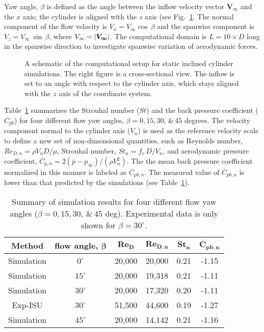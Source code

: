 Yaw angle, $\beta$ is defined as the angle between the inflow velocity vector
$\boldsymbol{V_\infty}$ and the $x$ axis; the cylinder is aligned with the $z$
axis (see Fig.~\ref{fig:yawedModel}. The normal component of the flow velocity
is $V_n=V_\infty \cos\,\beta$ and the spanwise component is $V_z = V_\infty
\,\sin\,\beta$, where $V_\infty=\left| \boldsymbol{V_\infty} \right|$. The computational
domain is $L=10\times D$ long in the spanwise direction to investigate spanwise
variation of aerodynamic forces.
%
\begin{figure}[htb!]
  \caption{A schematic of the computational setup for static inclined cylinder
    simulations. The right figure is a cross-sectional view.  The inflow is set
    to an angle with respect to the cylinder axis, which stays aligned with the $z$
    axis of the coordinate system.}
  \label{fig:yawedModel}
\end{figure}

Table~\ref{tab:comparisonYawedRe20k} summarizes the Strouhal number ($St$) and
the back pressure coefficient ($C_{pb}$) for four different flow yaw angles,
$\beta=0,15,30,\,\&\,45$ degrees. The velocity component normal to the cylinder
axis ($V_n$) is used as the reference velocity scale to define a new set of
non-dimensional quantities, such as Reynolds number, $Re_{D,n} = \rho V_n D /
\mu$, Strouhal number, $St_{n}=f_v\,D /V_n$, and aerodynamic pressure
coefficient, $\overline{C}_{p,n}=2 (\overline{p}-p_\infty)/(\rho V_n^2)$. The
the mean back pressure coefficient normalized in this manner is labeled as
$\overline{C}_{pb,n}$. The measured value of $\overline{C}_{pb,n}$ is lower
than that predicted by the simulations (see
Table~\ref{tab:comparisonYawedRe20k}).
%
\begin{table}[htb!]
  \caption{Summary of simulation results for four different flow yaw angles
  ($\beta=0, 15, 30,~\&~45$ deg). Experimental data is only shown for
  $\beta=30^\circ$.} 
  \label{tab:comparisonYawedRe20k} 
  \begin{center}
  \begin{tabular}{c|c|c|c|c|c}
      \textbf{Method} & \textbf{flow angle,} $\boldsymbol{\beta}$ & $\boldsymbol{Re_D}$ & $\boldsymbol{Re_{D,n}}$  & $\boldsymbol{St_{n}}$ & $\boldsymbol{\overline{C}_{pb,n}}$  \\ \hline
      \hline
      Simulation  & $0^\circ$  & 20,000 & 20,000 & 0.21 & -1.15 \\ \hline
      Simulation  & $15^\circ$ & 20,000 & 19,318 & 0.21 & -1.11 \\ \hline
      Simulation  & $30^\circ$ & 20,000 & 17,320 & 0.20 & -1.11  \\ \hline
      \rowcolor[gray]{.9}
      Exp-ISU     & $30^\circ$ & 51,500 & 44,600 & 0.19 & -1.27  \\ \hline
      Simulation  & $45^\circ$ & 20,000 & 14,142 & 0.21 & -1.16  \\ \hline
      \hline
  \end{tabular}
  \end{center}
\end{table}

